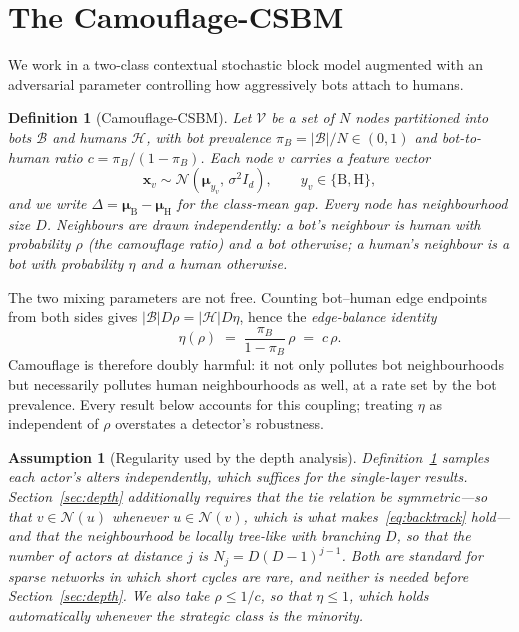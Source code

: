 \documentclass[onecolumn,pdflatex,sn-basic,Numbered]{sn-jnl}
\theoremstyle{thmstyleone}
\theoremstyle{thmstylethree}
\newtheorem{definition}[theorem]{Definition}
\newtheorem{assumption}[theorem]{Assumption}
\begin{document}
\section{The Camouflage-CSBM}
\label{sec:model}

We work in a two-class contextual stochastic block model augmented with an
adversarial parameter controlling how aggressively bots attach to humans.

\begin{definition}[Camouflage-CSBM]
\label{def:ccsbm}
Let $\mathcal{V}$ be a set of $N$ nodes partitioned into bots $\mathcal{B}$ and
humans $\mathcal{H}$, with bot prevalence $\pi_B = |\mathcal{B}|/N \in (0,1)$ and
bot-to-human ratio $c = \pi_B/(1-\pi_B)$. Each node $v$ carries a feature vector
\begin{equation}
    \mathbf{x}_v \sim \mathcal{N}(\boldsymbol{\mu}_{y_v},\, \sigma^2 I_d),
    \qquad y_v \in \{\mathrm{B}, \mathrm{H}\},
\end{equation}
and we write $\Delta = \boldsymbol{\mu}_{\mathrm{B}} - \boldsymbol{\mu}_{\mathrm{H}}$
for the class-mean gap. Every node has neighbourhood size $D$. Neighbours are drawn
independently: a bot's neighbour is human with probability $\rho$ (the
\emph{camouflage ratio}) and a bot otherwise; a human's neighbour is a bot with
probability $\eta$ and a human otherwise.
\end{definition}

The two mixing parameters are not free. Counting bot--human edge endpoints from
both sides gives $|\mathcal{B}| D \rho = |\mathcal{H}| D \eta$, hence the
\emph{edge-balance identity}
\begin{equation}
    \eta(\rho) \;=\; \frac{\pi_B}{1-\pi_B}\,\rho \;=\; c\,\rho .
    \label{eq:balance}
\end{equation}
Camouflage is therefore doubly harmful: it not only pollutes bot neighbourhoods but
necessarily pollutes human neighbourhoods as well, at a rate set by the bot
prevalence. Every result below accounts for this coupling; treating $\eta$ as
independent of $\rho$ overstates a detector's robustness.

\begin{assumption}[Regularity used by the depth analysis]
\label{as:tree}
Definition~\ref{def:ccsbm} samples each actor's alters independently, which suffices
for the single-layer results. Section~\ref{sec:depth} additionally requires that the
tie relation be \emph{symmetric}---so that $v \in \mathcal{N}(u)$ whenever
$u \in \mathcal{N}(v)$, which is what makes~\eqref{eq:backtrack} hold---and that the
neighbourhood be locally tree-like with branching $D$, so that the number of actors at
distance $j$ is $N_j = D(D-1)^{j-1}$. Both are standard for sparse networks in which
short cycles are rare, and neither is needed before Section~\ref{sec:depth}. We also
take $\rho \le 1/c$, so that $\eta \le 1$, which holds automatically whenever the
strategic class is the minority.
\end{assumption}
\end{document}
